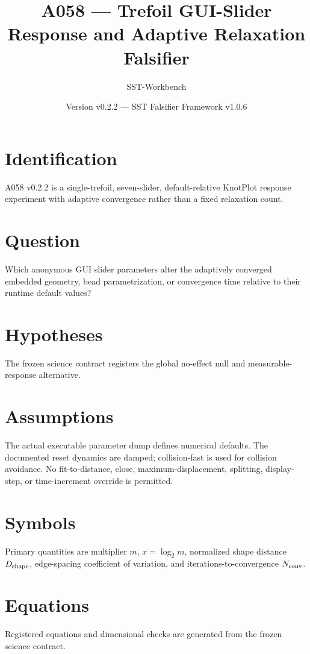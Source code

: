 \documentclass[11pt,a4paper]{article}
\begin{document}
\title{A058 --- Trefoil GUI-Slider Response and Adaptive Relaxation Falsifier}
\author{SST-Workbench}\date{Version v0.2.2 --- SST Falsifier Framework v1.0.6}\maketitle
{}
\section{Identification}
A058 v0.2.2 is a single-trefoil, seven-slider, default-relative KnotPlot response experiment with adaptive convergence rather than a fixed relaxation count.
\section{Question}
Which anonymous GUI slider parameters alter the adaptively converged embedded geometry, bead parametrization, or convergence time relative to their runtime default values?
\section{Hypotheses}
The frozen science contract registers the global no-effect null and measurable-response alternative.
\section{Assumptions}
The actual executable parameter dump defines numerical defaults. The documented reset dynamics are damped; collision-fast is used for collision avoidance. No fit-to-distance, close, maximum-displacement, splitting, display-step, or time-increment override is permitted.
\section{Symbols}
Primary quantities are multiplier $m$, $x=\log_2m$, normalized shape distance $D_{\rm shape}$, edge-spacing coefficient of variation, and iterations-to-convergence $N_{\rm conv}$.
\section{Equations}
Registered equations and dimensional checks are generated from the frozen science contract.
\end{document}
